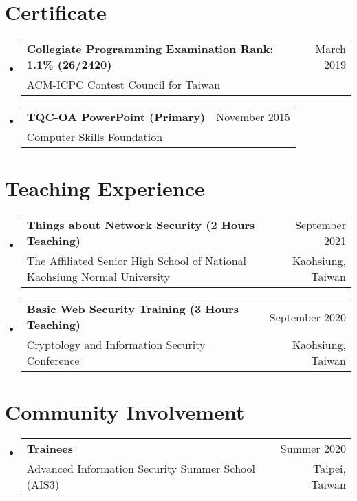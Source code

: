 \documentclass[A4,11pt]{article}
\makeatletter
\newcommand{\CVSubheading}[4]{
  \vspace{-2pt}\item
    \begin{tabular*}{0.97\textwidth}[t]{l@{\extracolsep{\fill}}r}
      \textbf{#1} & #2 \\
      \small#3 & \small #4 \\
    \end{tabular*}\vspace{-7pt}
}
\newcommand{\CVSubHeadingListStart}{\begin{itemize}[leftmargin=0.5cm, label={}]}
\newcommand{\CVSubHeadingListEnd}{\end{itemize}}
\makeatother
\begin{document}
\section{Certificate}
  \CVSubHeadingListStart
    \CVSubheading
      {Collegiate Programming Examination Rank: 1.1\% (26/2420)}{March 2019}
      {ACM-ICPC Contest Council for Taiwan}{}      
    \CVSubheading
      {TQC-OA PowerPoint (Primary)}{November 2015}
      {Computer Skills Foundation}{}
  \CVSubHeadingListEnd

\begin{comment}
  Section is here as it applied to my application for positions in academia. 
  Remember to tailor the resume for to the position.
  \end{comment}
  
  \section{Teaching Experience}
    \CVSubHeadingListStart
      \CVSubheading
        {Things about Network Security (2 Hours Teaching)}{September 2021}
        {The Affiliated Senior High School of National Kaohsiung Normal University}{Kaohsiung, Taiwan}
      \CVSubheading
        {Basic Web Security Training (3 Hours Teaching)}{September 2020}
        {Cryptology and Information Security Conference}{Kaohsiung, Taiwan}
    \CVSubHeadingListEnd

\section{Community Involvement}
  \CVSubHeadingListStart
    \CVSubheading
      {Trainees}{Summer 2020}
      {Advanced Information Security Summer School (AIS3)}{Taipei, Taiwan}
  \CVSubHeadingListEnd

\begin{comment}
This section is compressed from the various skills sections that Euro CV
recommends.
\end{comment}
\end{document}
